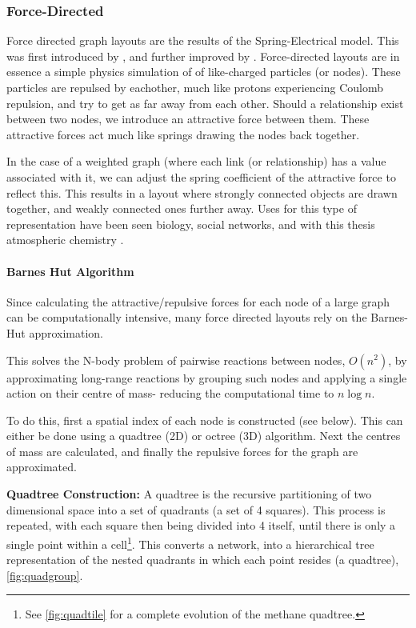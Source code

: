 \subsubsection{Force-Directed}

Force directed graph layouts are the results of the Spring-Electrical model. This was first introduced by \cite{Eades}, and further improved by \cite{raingold}. Force-directed layouts are in essence a simple physics simulation of of like-charged particles (or nodes). These particles are repulsed by eachother, much like protons experiencing Coulomb repulsion, and try to get as far away from each other. Should a relationship exist between two nodes, we introduce an attractive force between them. These attractive forces act much like springs drawing the nodes back together. 

In the case of a weighted graph (where each link (or relationship) has a value associated with it, we can adjust the spring coefficient of the attractive force to reflect this. This results in a layout where strongly connected objects are drawn together, and weakly connected ones further away. Uses for this type of representation have been seen biology, social networks, and with this thesis atmospheric chemistry \cite{ch3,ch4}.



\paragraph*{Barnes Hut Algorithm}
Since calculating the attractive/repulsive forces for each node of a large graph can be computationally intensive, many force directed layouts rely on the Barnes-Hut approximation.

This solves the N-body problem of pairwise reactions between nodes, $O(n^2)$, by approximating long-range reactions by grouping such nodes and applying a single action on their centre of mass- reducing the computational time to $n \log n$.  

To do this, first a spatial index of each node is constructed (see below). This can either be done using a quadtree (2D) or octree (3D) algorithm. Next the centres of mass are calculated, and finally the repulsive forces for the graph are approximated. 

\textbf{Quadtree Construction:}
A quadtree is the recursive partitioning of two dimensional space into a set of quadrants (a set of 4 squares). This process is repeated, with each square then being divided into 4 itself, until there is only a single point within a cell\footnote{See \autoref{fig:quadtile} for a complete evolution of the methane quadtree.}. This converts a network, into a hierarchical tree representation of the nested quadrants in which each point resides (a quadtree), \autoref{fig:quadgroup}. 


